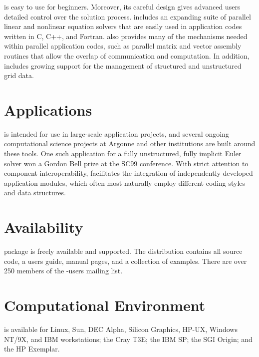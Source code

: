  is easy to use for beginners.  Moreover, its careful
design gives advanced users detailed control over the
solution process.  includes an expanding suite of parallel
linear and nonlinear equation solvers that are easily used in
application codes written in C, C++, and Fortran.   also
provides many of the mechanisms needed within parallel application
codes, such as parallel matrix and vector assembly routines
that allow the overlap of communication and computation.  In addition,
 includes growing support for the management of structured and
unstructured grid data.
\vsp

\section*{Applications}
 is intended for use in large-scale application projects,
and several ongoing computational science projects at Argonne and
other institutions are built around these tools.  One such application
for a fully unstructured, fully implicit Euler solver
won a Gordon Bell prize at the SC99 conference.
With strict attention to component interoperability, 
facilitates the integration of independently developed application
modules, which often most naturally employ different coding styles and
data structures. 

\section*{Availability}

 package is freely available and supported.
The  distribution contains all source code, 
a users guide, manual pages, and a
collection of examples. There are over 250 members of the -users mailing list.

\section*{Computational Environment}
 is available for Linux, Sun, DEC Alpha, Silicon Graphics, HP-UX, Windows NT/9X, 
and IBM workstations; the Cray T3E; the IBM SP; the SGI Origin; and the HP Exemplar.

\vspace{-.1cm}
\makeinfo

